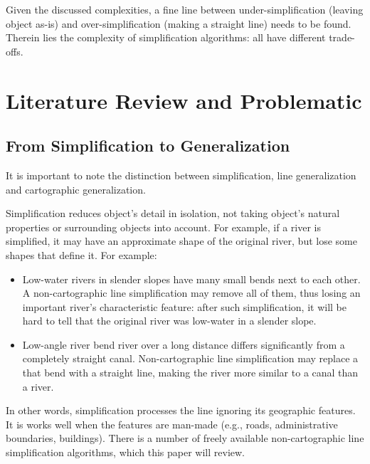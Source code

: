 \documentclass[a4paper]{article}
\begin{document}
Given the discussed complexities, a fine line between under-simplification
(leaving object as-is) and over-simplification (making a straight line) needs
to be found. Therein lies the complexity of simplification algorithms: all have
different trade-offs.

\section{Literature Review and Problematic}
\label{sec:literature-review-problematic}

\subsection{From Simplification to Generalization}
\label{sec:from-simplification-to-generalization}

It is important to note the distinction between simplification, line
generalization and cartographic generalization.

Simplification reduces object's detail in isolation, not taking object's
natural properties or surrounding objects into account. For example, if a
river is simplified, it may have an approximate shape of the original river,
but lose some shapes that define it. For example:

\begin{itemize}

  \item Low-water rivers in slender slopes have many small bends next to each
      other. A non-cartographic line simplification may remove all of them,
        thus losing an important river's characteristic feature: after such
        simplification, it will be hard to tell that the original river was
        low-water in a slender slope.

  \item Low-angle river bend river over a long distance differs significantly
      from a completely straight canal. Non-cartographic line simplification
        may replace a that bend with a straight line, making the river more
        similar to a canal than a river.

\end{itemize}

In other words, simplification processes the line ignoring its geographic
features. It is works well when the features are man-made (e.g., roads,
administrative boundaries, buildings). There is a number of freely available
non-cartographic line simplification algorithms, which this paper will review.
\end{document}
